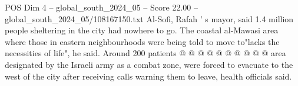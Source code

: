 \begin{textsample}{POS Dim 4 – global\_south\_2024\_05 – Score 22.00 – global\_south\_2024\_05/108167150.txt}
Al-Sofi, Rafah ' s mayor, said 1.4 million people sheltering in the city had nowhere to go.
The coastal al-Mawasi area where those in eastern neighbourhoods were being told to move to"lacks the necessities of life", he said.
Around 200 patients @ @ @ @ @ @ @ @ @ @ area designated by the Israeli army as a combat zone, were forced to evacuate to the west of the city after receiving calls warning them to leave, health officials said.

\end{textsample}

